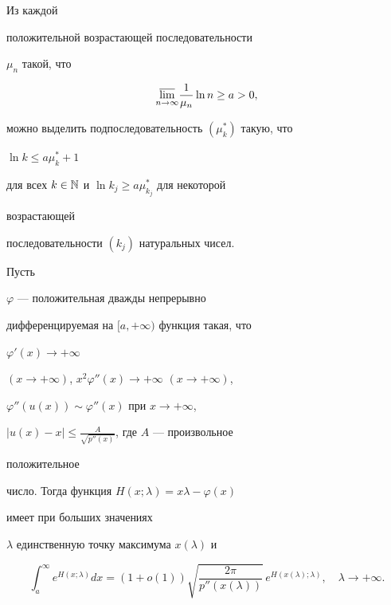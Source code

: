 \begin{lem} Из каждой 


положительной возрастающей последовательности 


$\mu_n$ такой, что 


$$ 


\underset{n\to\infty}{\varlimsup}\frac{1}{\mu_n} 


\ln n\ge a>0, 


$$ 


можно выделить подпоследовательность $(\mu^*_k)$ такую, что 


$\ln k\le a\mu^*_k+1$ 


для всех $k\in \Bbb N$ и $\ln k_j\ge a\mu^*_{k_j}$ для некоторой 


возрастающей 


последовательности $(k_j)$ натуральных чисел. 


\end{lem} 


 


\begin{lem} Пусть 


$\varphi$ --- положительная дважды непрерывно 


дифференцируемая на $[a,+\infty)$ функция такая, что 


$\varphi'(x)\to+\infty$ 


$(x\to+\infty)$, $x^2\varphi''(x)\to+\infty$ $(x\to+\infty)$,


$\varphi''(u(x))\sim\varphi''(x)$ при $x\to+\infty$,


$|u(x)-x|\le\frac{A}{\sqrt{p''(x)}}$, где $A$ --- произвольное 


положительное 


число. Тогда функция $H(x;\lambda)=x\lambda-\varphi(x)$ 


имеет при больших значениях 


$\lambda$ единственную точку максимума $x(\lambda)$ и 


\begin{equation} 


\int^\infty_a e^{H(x;\lambda)}dx=(1+o(1)) 


\sqrt{\frac{2\pi}{p''(x(\lambda))}}\, 


e^{H(x(\lambda);\lambda)},\quad \lambda\to+\infty. 


\end{equation} 


\end{lem} 


